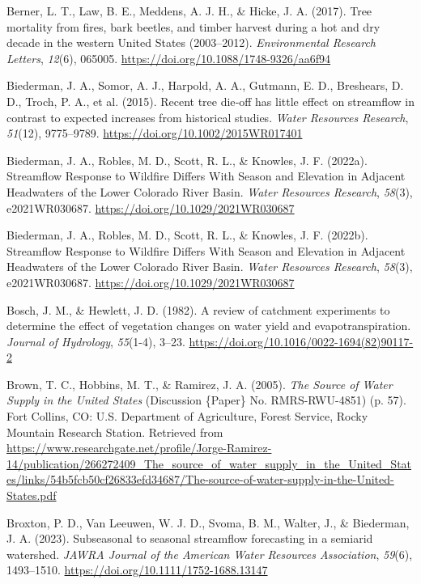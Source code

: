 \documentclass[
]{agujournal2019}
\newlength{\cslhangindent}
\newenvironment{CSLReferences}[2] %
 {\begin{list}{}{%
  \setlength{\itemindent}{0pt}
  \setlength{\leftmargin}{0pt}
  \setlength{\parsep}{0pt}
  \ifodd #1
   \setlength{\leftmargin}{\cslhangindent}
   \setlength{\itemindent}{-1\cslhangindent}
  \fi
  \setlength{\itemsep}{#2\baselineskip}}}
 {\end{list}}
\begin{document}
\begin{CSLReferences}{1}{0}
Berner, L. T., Law, B. E., Meddens, A. J. H., \& Hicke, J. A. (2017).
Tree mortality from fires, bark beetles, and timber harvest during a hot
and dry decade in the western {United} {States} (2003--2012).
\emph{Environmental Research Letters}, \emph{12}(6), 065005.
\url{https://doi.org/10.1088/1748-9326/aa6f94}

Biederman, J. A., Somor, A. J., Harpold, A. A., Gutmann, E. D.,
Breshears, D. D., Troch, P. A., et al. (2015). Recent tree die‐off has
little effect on streamflow in contrast to expected increases from
historical studies. \emph{Water Resources Research}, \emph{51}(12),
9775--9789. \url{https://doi.org/10.1002/2015WR017401}

Biederman, J. A., Robles, M. D., Scott, R. L., \& Knowles, J. F.
(2022a). Streamflow {Response} to {Wildfire} {Differs} {With} {Season}
and {Elevation} in {Adjacent} {Headwaters} of the {Lower} {Colorado}
{River} {Basin}. \emph{Water Resources Research}, \emph{58}(3),
e2021WR030687. \url{https://doi.org/10.1029/2021WR030687}

Biederman, J. A., Robles, M. D., Scott, R. L., \& Knowles, J. F.
(2022b). Streamflow Response to Wildfire Differs With Season and
Elevation in Adjacent Headwaters of the Lower Colorado River Basin.
\emph{Water Resources Research}, \emph{58}(3), e2021WR030687.
\url{https://doi.org/10.1029/2021WR030687}

Bosch, J. M., \& Hewlett, J. D. (1982). A review of catchment
experiments to determine the effect of vegetation changes on water yield
and evapotranspiration. \emph{Journal of Hydrology}, \emph{55}(1-4),
3--23. \url{https://doi.org/10.1016/0022-1694(82)90117-2}

Brown, T. C., Hobbins, M. T., \& Ramirez, J. A. (2005). \emph{The
{Source} of {Water} {Supply} in the {United} {States}} (Discussion
\{Paper\} No. RMRS-RWU-4851) (p. 57). Fort Collins, CO: U.S. Department
of Agriculture, Forest Service, Rocky Mountain Research Station.
Retrieved from
\url{https://www.researchgate.net/profile/Jorge-Ramirez-14/publication/266272409_The_source_of_water_supply_in_the_United_States/links/54b5fcb50cf26833efd34687/The-source-of-water-supply-in-the-United-States.pdf}

Broxton, P. D., Van Leeuwen, W. J. D., Svoma, B. M., Walter, J., \&
Biederman, J. A. (2023). Subseasonal to seasonal streamflow forecasting
in a semiarid watershed. \emph{JAWRA Journal of the American Water
Resources Association}, \emph{59}(6), 1493--1510.
\url{https://doi.org/10.1111/1752-1688.13147}


\end{CSLReferences}
\end{document}
